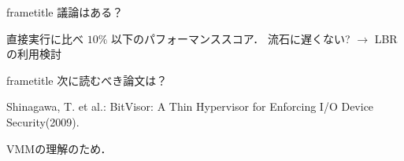 \begin{frame}[plain,t]
\begin{multicols}{2}
    \vfill
    \begin{beamercolorbox}[rounded=true, center, shadow=true,wd=\linewidth]{frametitle}
      議論はある？
    \end{beamercolorbox}
    直接実行に比べ $10\%$ 以下のパフォーマンススコア． 流石に遅くない? $\to$ LBRの利用検討

    \vfill
    \begin{beamercolorbox}[rounded=true, center, shadow=true,wd=\linewidth]{frametitle}
      次に読むべき論文は？
    \end{beamercolorbox}
    Shinagawa, T. et al.: BitVisor: A Thin Hypervisor for Enforcing I/O Device Security(2009).

    VMMの理解のため．

  \end{multicols}
\end{frame}

